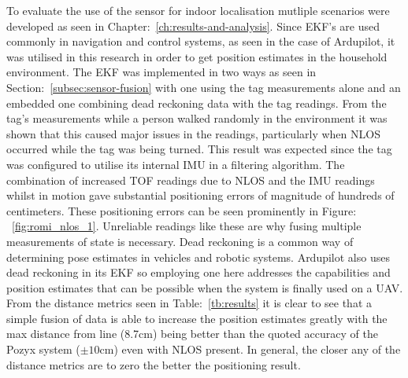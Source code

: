 To evaluate the use of the sensor for indoor localisation mutliple scenarios were developed as seen in Chapter:~\ref{ch:results-and-analysis}.
Since EKF's are used commonly in navigation and control systems, as seen in the case of Ardupilot, it was utilised in this research in order to get position estimates in the household environment.
The EKF was implemented in two ways as seen in Section:~\ref{subsec:sensor-fusion} with one using the tag measurements alone and an embedded one combining dead reckoning data with the tag readings.
From the tag's measurements while a person walked randomly in the environment it was shown that this caused major issues in the readings, particularly when NLOS occurred while the tag was being turned.
This result was expected since the tag was configured to utilise its internal IMU in a filtering algorithm.
The combination of increased TOF readings due to NLOS and the IMU readings whilst in motion gave substantial positioning errors of magnitude of hundreds of centimeters.
These positioning errors can be seen prominently in Figure: ~\ref{fig:romi_nlos_1}.
Unreliable readings like these are why fusing multiple measurements of state is necessary.
Dead reckoning is a common way of determining pose estimates in vehicles and robotic systems.
Ardupilot also uses dead reckoning in its EKF so employing one here addresses the capabilities and position estimates that can be possible when the system is finally used on a UAV.
From the distance metrics seen in Table:~\ref{tb:results} it is clear to see that a simple fusion of data is able to increase the position estimates greatly with the max distance from line (8.7cm) being better than the quoted accuracy of the Pozyx system ($\pm10$cm) even with NLOS present.
In general, the closer any of the distance metrics are to zero the better the positioning result.

